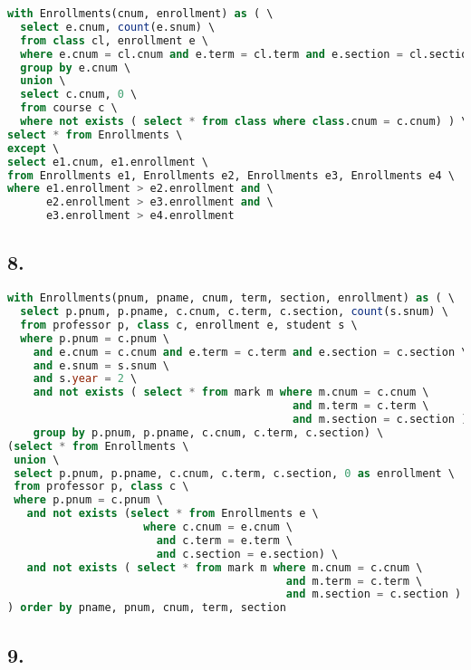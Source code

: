 \documentclass[12pt]{article}
\begin{document}
\begin{lstlisting}[language=sql]
with Enrollments(cnum, enrollment) as ( \
  select e.cnum, count(e.snum) \
  from class cl, enrollment e \
  where e.cnum = cl.cnum and e.term = cl.term and e.section = cl.section \
  group by e.cnum \
  union \
  select c.cnum, 0 \
  from course c \
  where not exists ( select * from class where class.cnum = c.cnum) ) \
select * from Enrollments \
except \
select e1.cnum, e1.enrollment \
from Enrollments e1, Enrollments e2, Enrollments e3, Enrollments e4 \
where e1.enrollment > e2.enrollment and \
      e2.enrollment > e3.enrollment and \
      e3.enrollment > e4.enrollment
\end{lstlisting}
\vspace{1em}
\subsection*{8.}

\begin{lstlisting}[language=sql]
with Enrollments(pnum, pname, cnum, term, section, enrollment) as ( \
  select p.pnum, p.pname, c.cnum, c.term, c.section, count(s.snum) \
  from professor p, class c, enrollment e, student s \
  where p.pnum = c.pnum \
    and e.cnum = c.cnum and e.term = c.term and e.section = c.section \
    and e.snum = s.snum \
    and s.year = 2 \
    and not exists ( select * from mark m where m.cnum = c.cnum \
                                            and m.term = c.term \
                                            and m.section = c.section ) \
    group by p.pnum, p.pname, c.cnum, c.term, c.section) \
(select * from Enrollments \
 union \
 select p.pnum, p.pname, c.cnum, c.term, c.section, 0 as enrollment \
 from professor p, class c \
 where p.pnum = c.pnum \
   and not exists (select * from Enrollments e \
                     where c.cnum = e.cnum \
                       and c.term = e.term \
                       and c.section = e.section) \
   and not exists ( select * from mark m where m.cnum = c.cnum \
                                           and m.term = c.term \
                                           and m.section = c.section ) \
) order by pname, pnum, cnum, term, section
\end{lstlisting}
\vspace{1em}
\pagebreak  %
\subsection*{9.}
\end{document}
